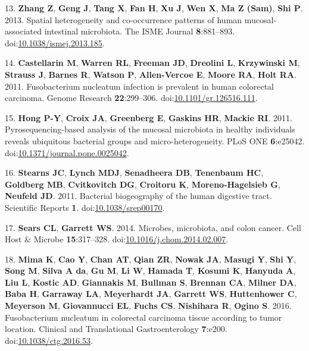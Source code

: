 \documentclass[11pt,]{article}
\begin{document}
\hypertarget{ref-Zhang2013}{}
13. \textbf{Zhang Z}, \textbf{Geng J}, \textbf{Tang X}, \textbf{Fan H},
\textbf{Xu J}, \textbf{Wen X}, \textbf{Ma Z (Sam)}, \textbf{Shi P}.
2013. Spatial heterogeneity and co-occurrence patterns of human
mucosal-associated intestinal microbiota. The ISME Journal
\textbf{8}:881--893.
doi:\href{https://doi.org/10.1038/ismej.2013.185}{10.1038/ismej.2013.185}.

\hypertarget{ref-Castellarin2011}{}
14. \textbf{Castellarin M}, \textbf{Warren RL}, \textbf{Freeman JD},
\textbf{Dreolini L}, \textbf{Krzywinski M}, \textbf{Strauss J},
\textbf{Barnes R}, \textbf{Watson P}, \textbf{Allen-Vercoe E},
\textbf{Moore RA}, \textbf{Holt RA}. 2011. Fusobacterium nucleatum
infection is prevalent in human colorectal carcinoma. Genome Research
\textbf{22}:299--306.
doi:\href{https://doi.org/10.1101/gr.126516.111}{10.1101/gr.126516.111}.

\hypertarget{ref-Hong2011}{}
15. \textbf{Hong P-Y}, \textbf{Croix JA}, \textbf{Greenberg E},
\textbf{Gaskins HR}, \textbf{Mackie RI}. 2011. Pyrosequencing-based
analysis of the mucosal microbiota in healthy individuals reveals
ubiquitous bacterial groups and micro-heterogeneity. PLoS ONE
\textbf{6}:e25042.
doi:\href{https://doi.org/10.1371/journal.pone.0025042}{10.1371/journal.pone.0025042}.

\hypertarget{ref-Stearns2011}{}
16. \textbf{Stearns JC}, \textbf{Lynch MDJ}, \textbf{Senadheera DB},
\textbf{Tenenbaum HC}, \textbf{Goldberg MB}, \textbf{Cvitkovitch DG},
\textbf{Croitoru K}, \textbf{Moreno-Hagelsieb G}, \textbf{Neufeld JD}.
2011. Bacterial biogeography of the human digestive tract. Scientific
Reports \textbf{1}.
doi:\href{https://doi.org/10.1038/srep00170}{10.1038/srep00170}.

\hypertarget{ref-Sears2014}{}
17. \textbf{Sears CL}, \textbf{Garrett WS}. 2014. Microbes, microbiota,
and colon cancer. Cell Host \& Microbe \textbf{15}:317--328.
doi:\href{https://doi.org/10.1016/j.chom.2014.02.007}{10.1016/j.chom.2014.02.007}.

\hypertarget{ref-Mima2016}{}
18. \textbf{Mima K}, \textbf{Cao Y}, \textbf{Chan AT}, \textbf{Qian ZR},
\textbf{Nowak JA}, \textbf{Masugi Y}, \textbf{Shi Y}, \textbf{Song M},
\textbf{Silva A da}, \textbf{Gu M}, \textbf{Li W}, \textbf{Hamada T},
\textbf{Kosumi K}, \textbf{Hanyuda A}, \textbf{Liu L}, \textbf{Kostic
AD}, \textbf{Giannakis M}, \textbf{Bullman S}, \textbf{Brennan CA},
\textbf{Milner DA}, \textbf{Baba H}, \textbf{Garraway LA},
\textbf{Meyerhardt JA}, \textbf{Garrett WS}, \textbf{Huttenhower C},
\textbf{Meyerson M}, \textbf{Giovannucci EL}, \textbf{Fuchs CS},
\textbf{Nishihara R}, \textbf{Ogino S}. 2016. Fusobacterium nucleatum in
colorectal carcinoma tissue according to tumor location. Clinical and
Translational Gastroenterology \textbf{7}:e200.
doi:\href{https://doi.org/10.1038/ctg.2016.53}{10.1038/ctg.2016.53}.
\end{document}
